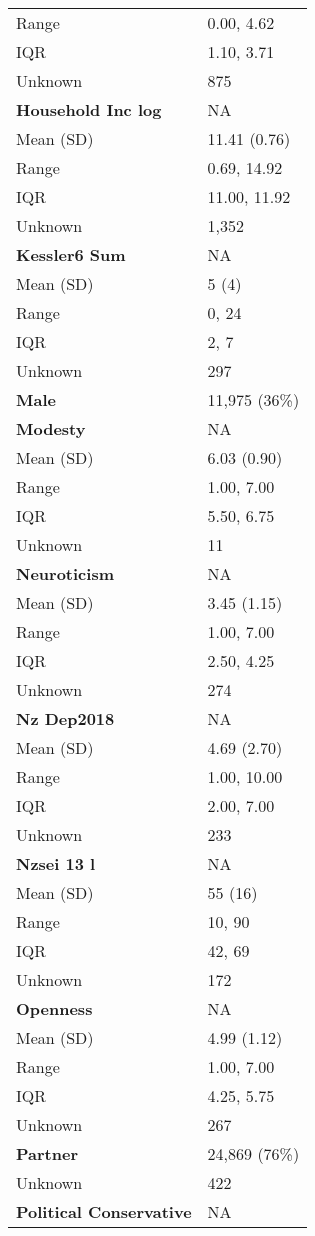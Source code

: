 \documentclass[
  single column]{article}
\begin{document}
\begin{longtable}[]{@{}ll@{}}
Range & 0.00, 4.62 \\
IQR & 1.10, 3.71 \\
Unknown & 875 \\
\textbf{Household Inc log} & NA \\
Mean (SD) & 11.41 (0.76) \\
Range & 0.69, 14.92 \\
IQR & 11.00, 11.92 \\
Unknown & 1,352 \\
\textbf{Kessler6 Sum} & NA \\
Mean (SD) & 5 (4) \\
Range & 0, 24 \\
IQR & 2, 7 \\
Unknown & 297 \\
\textbf{Male} & 11,975 (36\%) \\
\textbf{Modesty} & NA \\
Mean (SD) & 6.03 (0.90) \\
Range & 1.00, 7.00 \\
IQR & 5.50, 6.75 \\
Unknown & 11 \\
\textbf{Neuroticism} & NA \\
Mean (SD) & 3.45 (1.15) \\
Range & 1.00, 7.00 \\
IQR & 2.50, 4.25 \\
Unknown & 274 \\
\textbf{Nz Dep2018} & NA \\
Mean (SD) & 4.69 (2.70) \\
Range & 1.00, 10.00 \\
IQR & 2.00, 7.00 \\
Unknown & 233 \\
\textbf{Nzsei 13 l} & NA \\
Mean (SD) & 55 (16) \\
Range & 10, 90 \\
IQR & 42, 69 \\
Unknown & 172 \\
\textbf{Openness} & NA \\
Mean (SD) & 4.99 (1.12) \\
Range & 1.00, 7.00 \\
IQR & 4.25, 5.75 \\
Unknown & 267 \\
\textbf{Partner} & 24,869 (76\%) \\
Unknown & 422 \\
\textbf{Political Conservative} & NA \\

\end{longtable}
\end{document}
